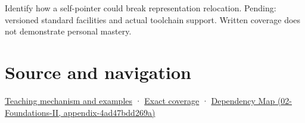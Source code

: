 Identify how a self-pointer could break representation relocation. Pending: versioned standard facilities and actual toolchain support. Written coverage does not demonstrate personal mastery.

\section{Source and navigation}\label{appendix-adfd6397af8d-source-and-navigation}

\href{Continuous\%20Notes/Computing\%20Foundations\%20-\%20From\%20Bits\%20to\%20C++\%20and\%20Systems\%20APIs\#From\%20three\%20repairs\%20to\%20five\%20decisions\%20to\%20zero\%20boilerplate}{Teaching mechanism and examples} · \hyperref[appendix-fd090d982a15-m009---parts-127-147]{Exact coverage} · \href{../02-Foundations-II/main.pdf\#nameddest=appendix-4ad47bdd269a}{Dependency Map (02-Foundations-II, appendix-4ad47bdd269a)}
